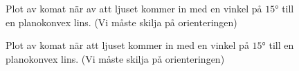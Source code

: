 \documentclass[a4paper]{article}
\begin{document}
\begin{figure}[h]
	\centering
	
	\caption{Plot av komat när av att ljuset kommer in med en vinkel på $15°$ till en planokonvex lins. (Vi måste skilja på orienteringen)}
	\label{fig:comP1}
\end{figure}
\begin{figure}[h]
	\centering
	
	\caption{Plot av komat när att ljuset kommer in med en vinkel på $15°$ till en planokonvex lins. (Vi måste skilja på orienteringen)}
	\label{fig:comM1}
\end{figure}
\end{document}
